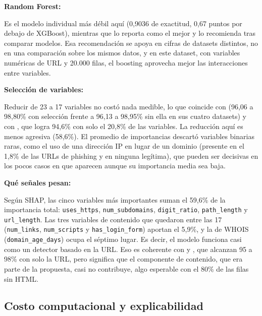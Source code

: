 \textbf{Random Forest:} \par
Es el modelo individual más débil aquí (0,9036 de exactitud, 0,67 puntos por debajo de XGBoost), mientras que \cite{rao2019detection} lo reporta como el mejor y \cite{ahmad2025across} lo recomienda tras comparar modelos. Esa recomendación se apoya en cifras de datasets distintos, no en una comparación sobre los mismos datos, y en este dataset, con variables numéricas de URL y 20.000 filas, el boosting aprovecha mejor las interacciones entre variables. \newline

\textbf{Selección de variables:} \par 
Reducir de 23 a 17 variables no costó nada medible, lo que coincide con \cite{kalabarige2023boosting} (96,06 a 98,80\% con selección frente a 96,13 a 98,95\% sin ella en sus cuatro datasets) y con \cite{chiew2019hybrid}, que logra 94,6\% con solo el 20,8\% de las variables. La reducción aquí es menos agresiva (58,6\%). El promedio de importancias descartó variables binarias raras, como el uso de una dirección IP en lugar de un dominio (presente en el 1,8\% de las URLs de phishing y en ninguna legítima), que pueden ser decisivas en los pocos casos en que aparecen aunque su importancia media sea baja.\newline

\textbf{Qué señales pesan:} \par
Según SHAP, las cinco variables más importantes suman el 59,6\% de la importancia total: \texttt{uses\_https}, \texttt{num\_subdomains}, \texttt{digit\_ratio}, \texttt{path\_length} y \texttt{url\_length}. Las tres variables de contenido que quedaron entre las 17 (\texttt{num\_links}, \texttt{num\_scripts} y \texttt{has\_login\_form}) aportan el 5,9\%, y la de WHOIS (\texttt{domain\_age\_days}) ocupa el séptimo lugar. Es decir, el modelo funciona casi como un detector basado en la URL. Eso es coherente con \cite{sahingoz2019machine} y \cite{aljofey2020effective}, que alcanzan 95 a 98\% con solo la URL, pero significa que el componente de contenido, que era parte de la propuesta, casi no contribuye, algo esperable con el 80\% de las filas sin HTML.

\subsection{Costo computacional y explicabilidad}


